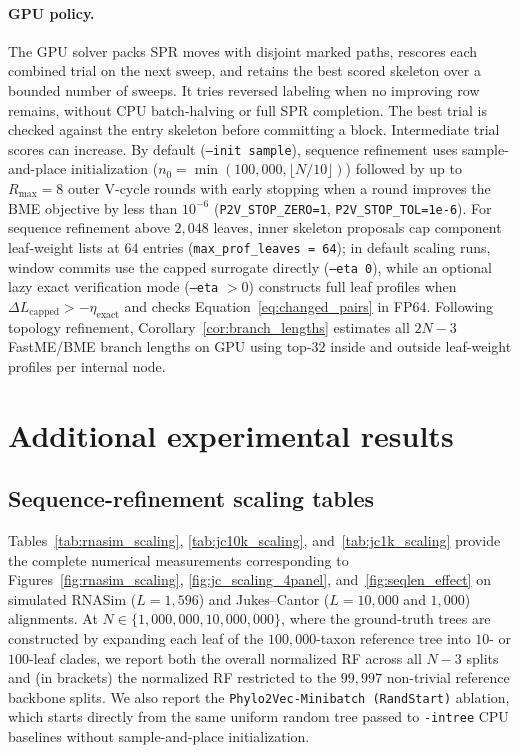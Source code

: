 \paragraph{GPU policy.}
The GPU solver packs SPR moves with disjoint marked paths, rescores each combined trial on the next sweep, and retains the best scored skeleton over a bounded number of sweeps.
It tries reversed labeling when no improving row remains, without CPU batch-halving or full SPR completion.
The best trial is checked against the entry skeleton before committing a block.
Intermediate trial scores can increase.
By default (\texttt{--init sample}), sequence refinement uses sample-and-place initialization ($n_0=\min(100{,}000,\lfloor N/10\rfloor)$) followed by up to $R_{\max}=8$ outer V-cycle rounds with early stopping when a round improves the BME objective by less than $10^{-6}$ (\texttt{P2V\_STOP\_ZERO=1}, \texttt{P2V\_STOP\_TOL=1e-6}).
For sequence refinement above $2{,}048$ leaves, inner skeleton proposals cap component leaf-weight lists at $64$ entries (\texttt{max\_prof\_leaves = 64}); in default scaling runs, window commits use the capped surrogate directly (\texttt{--eta 0}), while an optional lazy exact verification mode (\texttt{--eta} $>0$) constructs full leaf profiles when $\Delta L_{\mathrm{capped}}>-\eta_{\mathrm{exact}}$ and checks Equation~\eqref{eq:changed_pairs} in FP64.
Following topology refinement, Corollary~\ref{cor:branch_lengths} estimates all $2N-3$ FastME/BME branch lengths on GPU using top-$32$ inside and outside leaf-weight profiles per internal node.

\clearpage
\section{Additional experimental results}
\label{sec:additional_results}

\subsection{Sequence-refinement scaling tables}
\label{sec:jc_tables}

Tables~\ref{tab:rnasim_scaling}, \ref{tab:jc10k_scaling}, and~\ref{tab:jc1k_scaling} provide the complete numerical measurements corresponding to Figures~\ref{fig:rnasim_scaling}, \ref{fig:jc_scaling_4panel}, and~\ref{fig:seqlen_effect} on simulated RNASim ($L=1{,}596$) and Jukes--Cantor ($L=10{,}000$ and $1{,}000$) alignments.
At $N\in\{1{,}000{,}000,10{,}000{,}000\}$, where the ground-truth trees are constructed by expanding each leaf of the $100{,}000$-taxon reference tree into $10$- or $100$-leaf clades, we report both the overall normalized RF across all $N-3$ splits and (in brackets) the normalized RF restricted to the $99{,}997$ non-trivial reference backbone splits.
We also report the \texttt{Phylo2Vec-Minibatch (RandStart)} ablation, which starts directly from the same uniform random tree passed to \texttt{-intree} CPU baselines without sample-and-place initialization.

